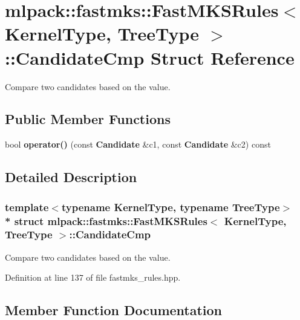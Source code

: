 \section{mlpack\+:\+:fastmks\+:\+:Fast\+M\+K\+S\+Rules$<$ Kernel\+Type, Tree\+Type $>$\+:\+:Candidate\+Cmp Struct Reference}
\label{structmlpack_1_1fastmks_1_1FastMKSRules_1_1CandidateCmp}


Compare two candidates based on the value.  


\subsection*{Public Member Functions}
\begin{DoxyCompactItemize}
\item 
bool {\bf operator()} (const {\bf Candidate} \&c1, const {\bf Candidate} \&c2) const 
\end{DoxyCompactItemize}


\subsection{Detailed Description}
\subsubsection*{template$<$typename Kernel\+Type, typename Tree\+Type$>$\\*
struct mlpack\+::fastmks\+::\+Fast\+M\+K\+S\+Rules$<$ Kernel\+Type, Tree\+Type $>$\+::\+Candidate\+Cmp}

Compare two candidates based on the value. 

Definition at line 137 of file fastmks\+\_\+rules.\+hpp.



\subsection{Member Function Documentation}
